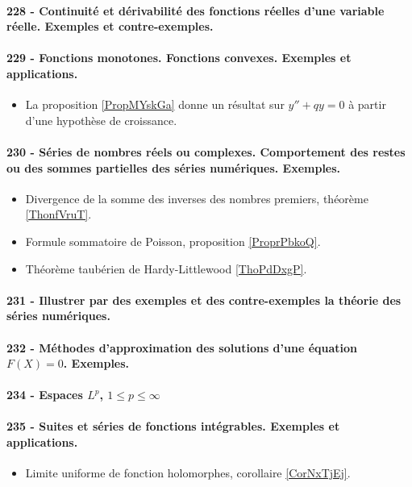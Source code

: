 \paragraph{228 - Continuité et dérivabilité des fonctions réelles d’une variable réelle. Exemples et contre-exemples.}
\paragraph{229 - Fonctions monotones. Fonctions convexes. Exemples et applications.}
\begin{itemize}
    \item La proposition \ref{PropMYskGa} donne un résultat sur \( y''+qy=0\) à partir d'une hypothèse de croissance.
\end{itemize}
\paragraph{230 - Séries de nombres réels ou complexes. Comportement des restes ou des sommes partielles des séries numériques. Exemples.}
\begin{itemize}
    \item Divergence de la somme des inverses des nombres premiers, théorème \ref{ThonfVruT}.
    \item Formule sommatoire de Poisson, proposition \ref{ProprPbkoQ}.
    \item Théorème taubérien de Hardy-Littlewood \ref{ThoPdDxgP}.
\end{itemize}


\paragraph{231 - Illustrer par des exemples et des contre-exemples la théorie des séries numériques.}
\paragraph{232 - Méthodes d’approximation des solutions d’une équation $F (X ) = 0$. Exemples.}

\paragraph{234 - Espaces \( L^p\), \( 1\leq p\leq\infty\)}
\paragraph{235 - Suites et séries de fonctions intégrables. Exemples et applications.}
\begin{itemize}
    \item Limite uniforme de fonction holomorphes, corollaire \ref{CorNxTjEj}.
\end{itemize}
